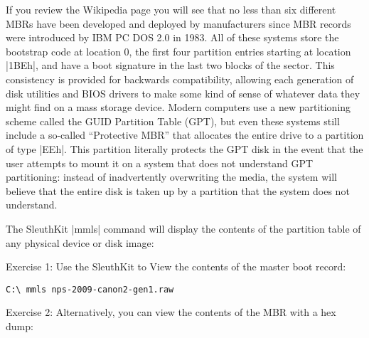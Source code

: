 \documentclass[11pt,letter]{book}
\begin{document}
If you review the Wikipedia page you will see that no less than six
different MBRs have been developed and deployed by manufacturers since
MBR records were introduced by IBM PC DOS 2.0 in 1983. All of these
systems store the bootstrap code at location 0, the first four
partition entries starting at location |1BEh|, and have a boot
signature in the last two blocks of the sector. This consistency is
provided for backwards compatibility, allowing each 
generation of disk utilities and BIOS drivers to make some kind of sense of
whatever data they might find on a mass storage device.  Modern
computers use a new partitioning scheme called the GUID Partition
Table (GPT), but even these systems still include a so-called
``Protective MBR'' that allocates the entire drive to a partition of
type |EEh|. This partition literally protects the GPT disk in the
event that the user attempts to mount it on a system that does not
understand GPT partitioning: instead of inadvertently overwriting the
media, the system will believe that the entire disk is taken up by a
partition that the system does not understand.

The SleuthKit |mmls| command will display the contents of the
partition table of any physical device or disk image:

Exercise 1: Use the SleuthKit to View the contents of the master boot
record:

\begin{Verbatim}
C:\ mmls nps-2009-canon2-gen1.raw
\end{Verbatim}

Exercise 2: Alternatively, you can view the contents of the MBR with a
hex dump:
\end{document}
